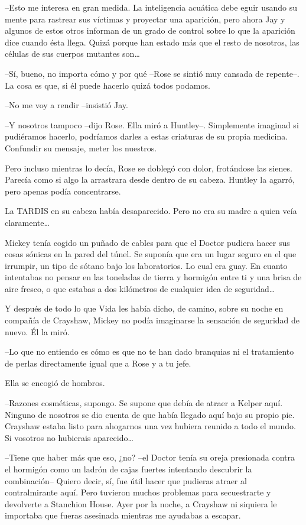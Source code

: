 {--Esto me interesa en gran medida. La inteligencia acuática debe eguir
 usando su mente para rastrear sus víctimas y proyectar una aparición,
 pero ahora Jay y algunos de estos otros informan de un grado de control
 sobre lo que la aparición dice cuando ésta llega. Quizá porque han
 estado más que el resto de nosotros, las células de sus cuerpos mutantes
 son\ldots{}}

{--Sí, bueno, no importa cómo y por qué --Rose se sintió muy cansada de
repente--. La cosa es que, si él puede hacerlo quizá todos podamos.}

{--No me voy a rendir --insistió Jay.}

{--Y nosotros tampoco --dijo Rose. Ella miró a Huntley--. Simplemente
 imaginad si pudiéramos hacerlo, podríamos darles a estas criaturas de su
propia medicina. Confundir su mensaje, meter los nuestros.}

{Pero incluso mientras lo decía, Rose se doblegó con dolor, frotándose
 las sienes. Parecía como si algo la arrastrara desde dentro de su
cabeza. Huntley la agarró, pero apenas podía concentrarse.}

{La TARDIS en su cabeza había desaparecido. Pero no era su madre a quien
 veía claramente\ldots{}}

\mbox{}

{Mickey tenía cogido un puñado de cables para que el Doctor pudiera
 hacer sus cosas sónicas en la pared del túnel. Se suponía que era un
 lugar seguro en el que irrumpir, un tipo de sótano bajo los
 laboratorios. Lo cual era guay. En cuanto intentabas no pensar en las
 toneladas de tierra y hormigón entre ti y una brisa de aire fresco, o
 que estabas a dos kilómetros de cualquier idea de seguridad\ldots{}}

{Y después de todo lo que Vida les había dicho, de camino, sobre su
 noche en compañía de Crayshaw, Mickey no podía imaginarse la sensación
de seguridad de nuevo. Él la miró.}

{--Lo que no entiendo es cómo es que no te han dado branquias ni el
tratamiento de perlas directamente igual que a Rose y a tu jefe.}

{Ella se encogió de hombros.}

{--Razones cosméticas, supongo. Se supone que debía de atraer a Kelper
 aquí. Ninguno de nosotros se dio cuenta de que había llegado aquí bajo
 su propio pie. Crayshaw estaba listo para ahogarnos una vez hubiera
 reunido a todo el mundo. Si vosotros no hubierais aparecido\ldots{}}

{--Tiene que haber más que eso, ¿no? --el Doctor tenía su oreja
 presionada contra el hormigón como un ladrón de cajas fuertes intentando
 descubrir la combinación-- Quiero decir, sí, fue útil hacer que pudieras
 atraer al contralmirante aquí. Pero tuvieron muchos problemas para
 secuestrarte y devolverte a Stanchion House. Ayer por la noche, a
 Crayshaw ni siquiera le importaba que fueras asesinada mientras me
ayudabas a escapar.}

